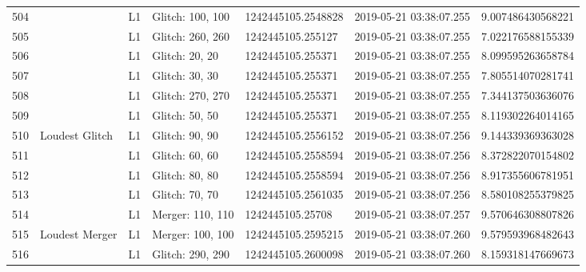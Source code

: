 \begin{longtable}{lllllll}
504  &                                                    &       L1 &  Glitch: 100, 100 &  1242445105.2548828 &  2019-05-21 03:38:07.255 &   9.007486430568221 \\
505  &                                                    &       L1 &  Glitch: 260, 260 &   1242445105.255127 &  2019-05-21 03:38:07.255 &   7.022176588155339 \\
506  &                                                    &       L1 &    Glitch: 20, 20 &   1242445105.255371 &  2019-05-21 03:38:07.255 &   8.099595263658784 \\
507  &                                                    &       L1 &    Glitch: 30, 30 &   1242445105.255371 &  2019-05-21 03:38:07.255 &   7.805514070281741 \\
508  &                                                    &       L1 &  Glitch: 270, 270 &   1242445105.255371 &  2019-05-21 03:38:07.255 &   7.344137503636076 \\
509  &                                                    &       L1 &    Glitch: 50, 50 &   1242445105.255371 &  2019-05-21 03:38:07.255 &   8.119302264014165 \\
510  &                                     Loudest Glitch &       L1 &    Glitch: 90, 90 &  1242445105.2556152 &  2019-05-21 03:38:07.256 &   9.144339369363028 \\
511  &                                                    &       L1 &    Glitch: 60, 60 &  1242445105.2558594 &  2019-05-21 03:38:07.256 &   8.372822070154802 \\
512  &                                                    &       L1 &    Glitch: 80, 80 &  1242445105.2558594 &  2019-05-21 03:38:07.256 &   8.917355606781951 \\
513  &                                                    &       L1 &    Glitch: 70, 70 &  1242445105.2561035 &  2019-05-21 03:38:07.256 &   8.580108255379825 \\
514  &                                                    &       L1 &  Merger: 110, 110 &    1242445105.25708 &  2019-05-21 03:38:07.257 &   9.570646308807826 \\
515  &                                     Loudest Merger &       L1 &  Merger: 100, 100 &  1242445105.2595215 &  2019-05-21 03:38:07.260 &   9.579593968482643 \\
516  &                                                    &       L1 &  Glitch: 290, 290 &  1242445105.2600098 &  2019-05-21 03:38:07.260 &   8.159318147669673 \\

\end{longtable}
